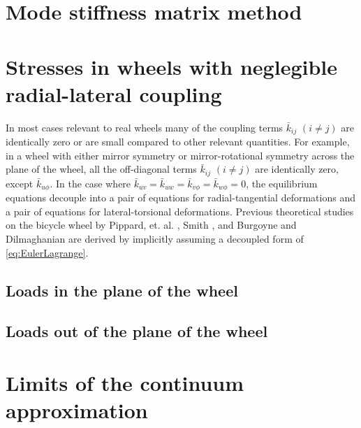 \documentclass[\rootdir/thesis.tex]{subfiles}
\begin{document}
\section{Mode stiffness matrix method}
\label{sec:ModeMatrix}



\section{Stresses in wheels with neglegible radial-lateral coupling}
In most cases relevant to real wheels many of the coupling terms $\bar{k}_{ij}$ $(i \neq j)$ are identically zero or are small compared to other relevant quantities. For example, in a wheel with either mirror symmetry or mirror-rotational symmetry across the plane of the wheel, all the off-diagonal terms $\bar{k}_{ij}$ $(i \neq j)$ are identically zero, except $\bar{k}_{u\phi}$. In the case where $\bar{k}_{uv}=\bar{k}_{uw}=\bar{k}_{v\phi}=\bar{k}_{w\phi}=0$, the equilibrium equations decouple into a pair of equations for radial-tangential deformations and a pair of equations for lateral-torsional deformations. Previous theoretical studies on the bicycle wheel by Pippard, et. al. \cite{Pippard1931,Pippard1932a,Pippard1932b}, Smith \cite{Smith1901}, and Burgoyne and Dilmaghanian \cite{Burgoyne1993} are derived by implicitly assuming a decoupled form of \eqref{eq:EulerLagrange}.

\subsection{Loads in the plane of the wheel}
\label{sec:RadTan}


\subsection{Loads out of the plane of the wheel}
\label{sec:Lateral}


\section{Limits of the continuum approximation}
\inprogress
\end{document}
